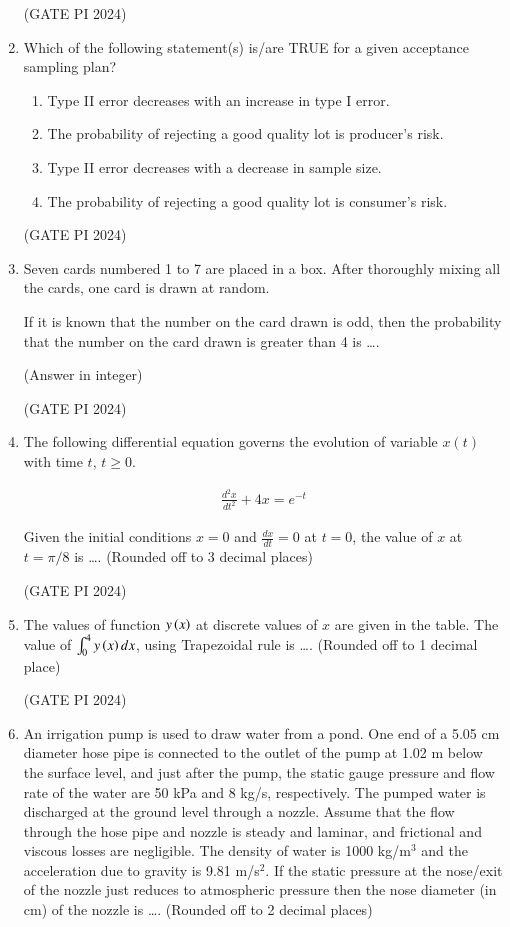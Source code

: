 \documentclass[journal,12pt,onecolumn]{IEEEtran}
\theoremstyle{remark}
\begin{document}
\begin{enumerate}
\hfill (GATE PI 2024)

\item Which of the following statement(s) is/are TRUE for a given acceptance sampling plan?

\begin{enumerate}
\item Type II error decreases with an increase in type I error.
\item The probability of rejecting a good quality lot is producer's risk.
\item Type II error decreases with a decrease in sample size.
\item The probability of rejecting a good quality lot is consumer's risk.
\end{enumerate}

\hfill (GATE PI 2024)

\item Seven cards numbered 1 to 7 are placed in a box. After thoroughly mixing all the cards, one card is drawn at random.

If it is known that the number on the card drawn is odd, then the probability that the number on the card drawn is greater than 4 is \dots.

(Answer in integer)

\hfill (GATE PI 2024)

\item The following differential equation governs the evolution of variable $x(t)$ with time $t$, $t \geq 0$.

\begin{align*}
\frac{d^2x}{dt^2} + 4x = e^{-t}
\end{align*}

Given the initial conditions $x = 0$ and $\frac{dx}{dt} = 0$ at $t = 0$, the value of $x$ at $t = \pi/8$ is \dots .
(Rounded off to 3 decimal places)

\hfill (GATE PI 2024)

\item The values of function $y\left(x\right)$ at discrete values of $x$ are given in the table. The value of $\int_0^4 y\left(x\right)dx$, using Trapezoidal rule is \dots .
(Rounded off to 1 decimal place)



\hfill (GATE PI 2024)

\item An irrigation pump is used to draw water from a pond. One end of a 5.05 cm diameter hose pipe is connected to the outlet of the pump at 1.02 m below the surface level, and just after the pump, the static gauge pressure and flow rate of the water are 50 kPa and 8 kg/s, respectively. The pumped water is discharged at the ground level through a nozzle. Assume that the flow through the hose pipe and nozzle is steady and laminar, and frictional and viscous losses are negligible. The density of water is 1000 kg/m$^3$ and the acceleration due to gravity is 9.81 m/s$^2$. If the static pressure at the nose/exit of the nozzle just reduces to atmospheric pressure then the nose diameter (in cm) of the nozzle is \dots . (Rounded off to 2 decimal places)


\end{enumerate}
\end{document}

